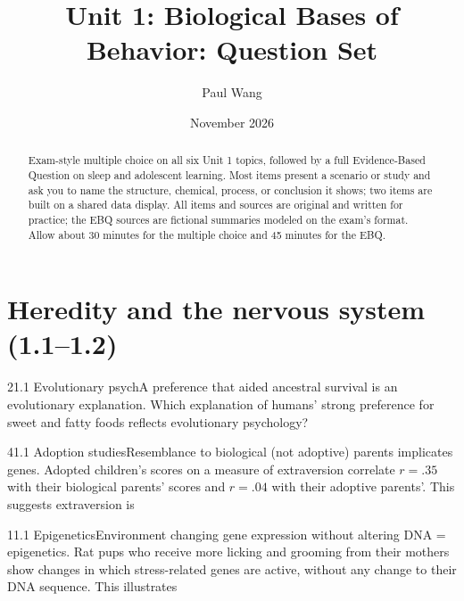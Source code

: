 \documentclass[11pt]{article}
\title{Unit 1: Biological Bases of Behavior: Question Set}
\author{Paul Wang}
\date{November 2026}
\begin{document}
\maketitle

\begin{abstract}
Exam-style multiple choice on all six Unit 1 topics, followed by a full Evidence-Based Question on sleep and adolescent learning. Most items present a scenario or study and ask you to name the structure, chemical, process, or conclusion it shows; two items are built on a shared data display. All items and sources are original and written for practice; the EBQ sources are fictional summaries modeled on the exam's format. Allow about 30 minutes for the multiple choice and 45 minutes for the EBQ.
\end{abstract}


\section{Heredity and the nervous system (1.1--1.2)}

\begin{q}{2}{1.1 Evolutionary psych}{A preference that aided ancestral survival is an evolutionary explanation.}
Which explanation of humans' strong preference for sweet and fatty foods reflects evolutionary psychology?
\end{q}

\begin{q}{4}{1.1 Adoption studies}{Resemblance to biological (not adoptive) parents implicates genes.}
Adopted children's scores on a measure of extraversion correlate \(r = .35\) with their biological parents' scores and \(r = .04\) with their adoptive parents'. This suggests extraversion is
\end{q}

\begin{q}{1}{1.1 Epigenetics}{Environment changing gene expression without altering DNA = epigenetics.}
Rat pups who receive more licking and grooming from their mothers show changes in which stress-related genes are active, without any change to their DNA sequence. This illustrates
\end{q}
\end{document}
